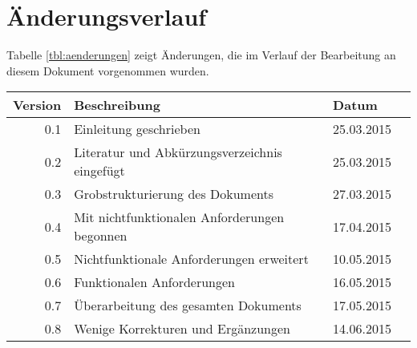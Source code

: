 \section*{Änderungsverlauf}

Tabelle \ref{tbl:aenderungen} zeigt Änderungen, die im Verlauf der Bearbeitung
an diesem Dokument vorgenommen wurden.
\\[\intextsep]
\begin{minipage}{\linewidth}
	\centering
	\begin{tabular}{rlll}
		\hline
		Version & Beschreibung                                  & Datum       \\
		\hline
		0.1     & Einleitung geschrieben                        & 25.03.2015  \\
		0.2     & Literatur und Abkürzungsverzeichnis eingefügt & 25.03.2015  \\
		0.3     & Grobstrukturierung des Dokuments              & 27.03.2015  \\
		0.4     & Mit nichtfunktionalen Anforderungen begonnen  & 17.04.2015  \\
		0.5     & Nichtfunktionale Anforderungen erweitert      & 10.05.2015  \\
		0.6     & Funktionalen Anforderungen                    & 16.05.2015  \\
		0.7     & Überarbeitung des gesamten Dokuments          & 17.05.2015  \\
		0.8     & Wenige Korrekturen und Ergänzungen            & 14.06.2015  \\
		\hline
	\end{tabular}
	\label{tbl:aenderungen}
\end{minipage}

